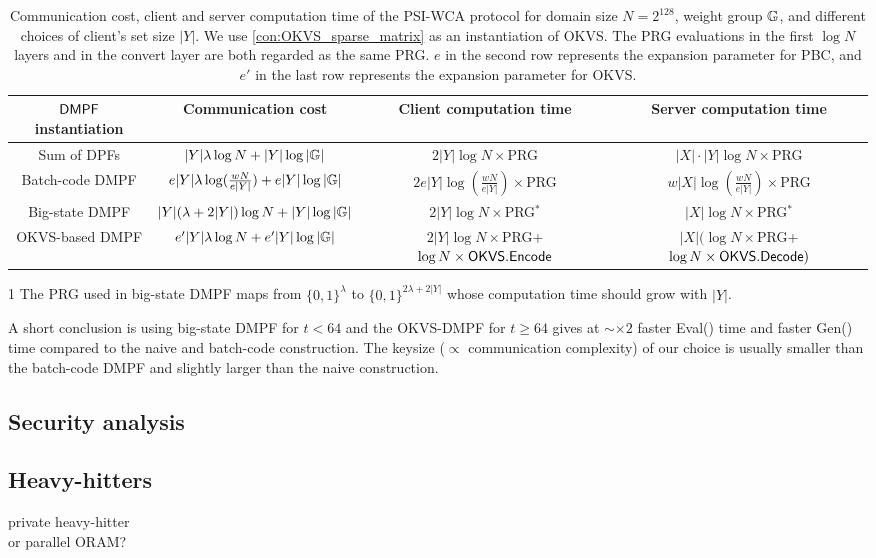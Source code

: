\begin{table*}
  \renewcommand\arraystretch{1.5}
  \begin{threeparttable}
  \caption{Communication cost, client and server computation time of the PSI-WCA protocol for domain size $N = 2^{128}$, weight group $\mathbb{G}$, and  different choices of client's set size $|Y|$. We use \cref{con:OKVS_sparse_matrix} as an instantiation of OKVS. The PRG evaluations in the first $\log N$ layers and in the convert layer are both regarded as the same PRG. $e$ in the second row represents the expansion parameter for PBC, and $e'$ in the last row represents the expansion parameter for OKVS. }
\label{tab:PSI_plug_in_formula}
  \begin{tabular}{cccc}
          \toprule
    ${\sf DMPF}$ instantiation & Communication cost & Client computation time & Server computation time \\
          \midrule

          Sum of DPFs & $|Y|\lambda\log N+|Y|\log|\mathbb{G}|$ & $2|Y|\log N\times $PRG & $|X|\cdot |Y|\log N\times $PRG\\

          Batch-code DMPF & $e|Y|\lambda\log(\frac{wN}{e|Y|})+e|Y|\log|\mathbb{G}|$ & $2e|Y|\log(\frac{wN}{e|Y|})\times$PRG & $w|X|\log(\frac{wN}{e|Y|})\times$PRG\\

          Big-state DMPF & $|Y|(\lambda+2|Y|)\log N+|Y|\log|\mathbb{G}|$ & $2|Y|\log N\times $PRG$^*$\tnote{1} & $|X|\log N \times$PRG$^*$\\

          OKVS-based DMPF& $e'|Y|\lambda\log N +e'|Y|\log|\mathbb{G}|$ & $2|Y|\log N\times$PRG+$\log N\times {\sf OKVS}.{\sf Encode}$ & $|X|(\log N\times$PRG+$\log N\times {\sf OKVS}.{\sf Decode})$\\
          \bottomrule
  \end{tabular}
  \begin{tablenotes}
    \item [1] The PRG used in big-state DMPF maps from $\{0,1\}^\lambda$ to $\{0,1\}^{2\lambda+2|Y|}$ whose computation time should grow with $|Y|$.
  \end{tablenotes}
\end{threeparttable}
\end{table*}



A short conclusion is using big-state DMPF for $t<64$ and the OKVS-DMPF for $t\ge 64$ gives at $\sim \times 2$ faster Eval() time and faster Gen() time compared to the naive and batch-code construction. The keysize ($\propto$ communication complexity) of our choice is usually smaller than the batch-code DMPF and slightly larger than the naive construction. 
\subsection{Security analysis}
\subsection{Heavy-hitters}
private heavy-hitter\\
or parallel ORAM?